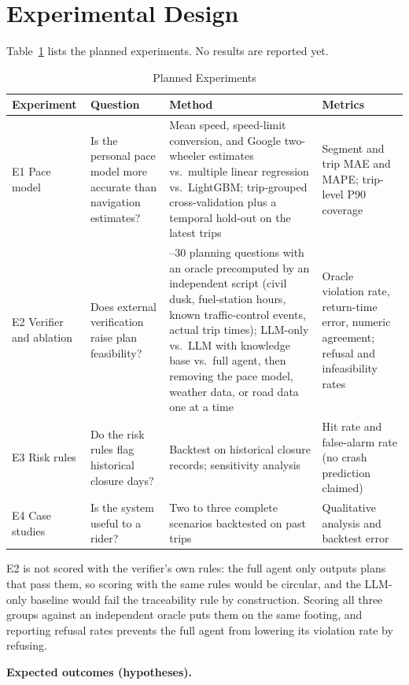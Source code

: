 \section{Experimental Design}
\label{sec:exp}

Table~\ref{tab:experiments} lists the planned experiments. No results are reported yet.

\begin{table}[!t]
\centering
\caption{Planned Experiments}
\label{tab:experiments}
\footnotesize
\renewcommand{\arraystretch}{1.2}
\begin{tabularx}{\textwidth}{@{}>{\raggedright\arraybackslash}p{2.3cm} >{\raggedright\arraybackslash}p{3.4cm} >{\raggedright\arraybackslash}X >{\raggedright\arraybackslash}p{4.2cm}@{}}
\toprule
Experiment & Question & Method & Metrics \\
\midrule
E1 Pace model & Is the personal pace model more accurate than navigation estimates? & Mean speed, speed-limit conversion, and Google two-wheeler estimates vs.\ multiple linear regression vs.\ LightGBM; trip-grouped cross-validation plus a temporal hold-out on the latest trips & Segment and trip MAE and MAPE; trip-level P90 coverage \\
E2 Verifier and ablation & Does external verification raise plan feasibility? & 20--30 planning questions with an oracle precomputed by an independent script (civil dusk, fuel-station hours, known traffic-control events, actual trip times); LLM-only vs.\ LLM with knowledge base vs.\ full agent, then removing the pace model, weather data, or road data one at a time & Oracle violation rate, return-time error, numeric agreement; refusal and infeasibility rates \\
E3 Risk rules & Do the risk rules flag historical closure days? & Backtest on historical closure records; sensitivity analysis & Hit rate and false-alarm rate (no crash prediction claimed) \\
E4 Case studies & Is the system useful to a rider? & Two to three complete scenarios backtested on past trips & Qualitative analysis and backtest error \\
\bottomrule
\end{tabularx}
\end{table}

E2 is not scored with the verifier's own rules: the full agent only outputs plans that pass them, so scoring with the same rules would be circular, and the LLM-only baseline would fail the traceability rule by construction. Scoring all three groups against an independent oracle puts them on the same footing, and reporting refusal rates prevents the full agent from lowering its violation rate by refusing.

\textbf{Expected outcomes (hypotheses).} 
